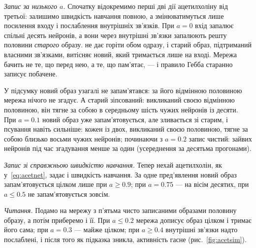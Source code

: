\emph{Запис за низького $a$.} Спочатку відокремимо перші дві дії ацетилхоліну від третьої: залишимо швидкість навчання повною, а змінюватимуться лише посилення входу і послаблення внутрішніх зв'язків. При $a=0$ вхід запалює спільні десять нейронів, а вони через внутрішні зв'язки запалюють решту половини \emph{старого} образу.  не дає горіти обом одразу, і старий образ, підтриманий власними зв'язками, витісняє новий, який тримається лише на вході. Мережа бачить не те, що перед нею, а те, що пам'ятає, --- і правило Гебба старанно записує побачене.

У підсумку новий образ узагалі не запам'ятався: за його відмінною половиною мережа нічого не згадує. А старий зіпсований: викликаний своєю відмінною половиною, він тягне за собою в середньому шість чужих нейронів із десяти. При $a=0.1$ новий образ уже запам'ятовується, але зливається зі старим, і псування навіть сильніше: кожен із двох, викликаний своєю половиною, тягне за собою близько восьми чужих нейронів; починаючи з $a=0.2$ запис чистий: зайвих нейронів під час згадування менше за один (усереднення за десятьма прогонами).

\emph{Запис зі справжньою швидкістю навчання.} Тепер нехай ацетилхолін, як у~\eqref{eq:acetnet}, задає і швидкість навчання. За одне пред'явлення новий образ запам'ятовується цілком лише при $a\ge0.9$; при $a=0.75$ --- на вісім десятих, при $a\le0.5$ не запам'ятовується зовсім.

\emph{Читання.} Подамо на мережу з п'ятьма чисто записаними образами половину образу, а потім приберемо і її. При $a\le0.2$ мережа дописує образ цілком і тримає його сама; при $a=0.3$ --- майже цілком; при $a\ge0.4$ внутрішні зв'язки надто послаблені, і після того як підказка зникла, активність гасне (рис.~\ref{fig:acetsim}).


